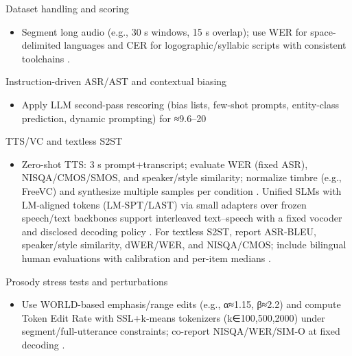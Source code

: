 \documentclass{article}
\begin{document}
Dataset handling and scoring
\begin{itemize}
  \item Segment long audio (e.g., 30 s windows, 15 s overlap); use WER for space-delimited languages and CER for logographic/syllabic scripts with consistent toolchains \cite{nguyen2025qwenvsgemmaintegrationwhispercomparative}.
\end{itemize}

Instruction-driven ASR/AST and contextual biasing
\begin{itemize}
  \item Apply LLM second-pass rescoring (bias lists, few-shot prompts, entity-class prediction, dynamic prompting) for ≈9.6–20%
\end{itemize}

TTS/VC and textless S2ST
\begin{itemize}
  \item Zero-shot TTS: 3 s prompt+transcript; evaluate WER (fixed ASR), NISQA/CMOS/SMOS, and speaker/style similarity; normalize timbre (e.g., FreeVC) and synthesize multiple samples per condition \cite{wang2024evaluatingtextspeechsynthesislargediscre}. Unified SLMs with LM-aligned tokens (LM‑SPT/LAST) via small adapters over frozen speech/text backbones support interleaved text–speech with a fixed vocoder and disclosed decoding policy \cite{turetzky2024lastlanguagemodelawarespeechtokenization,wang2023slmbridgethingapbetweenspeechtextfoundat,jo2025lmsptalignedsemanticdistillationspeechto}. For textless S2ST, report ASR‑BLEU, speaker/style similarity, dWER/WER, and NISQA/CMOS; include bilingual human evaluations with calibration and per-item medians \cite{peng2024mslms2stmultitaskspeechlanguagemodeltext,li2024investigatingneuralaudiocodecsspeechlang,huang2023holisticcascadesystembenchmarkhumanevalu}.
\end{itemize}

Prosody stress tests and perturbations
\begin{itemize}
  \item Use WORLD-based emphasis/range edits (e.g., α≈1.15, β≈2.2) and compute Token Edit Rate with SSL+k‑means tokenizers (k∈{100,500,2000}) under segment/full-utterance constraints; co-report NISQA/WER/SIM‑O at fixed decoding \cite{li2024investigatingneuralaudiocodecsspeechlang}.
\end{itemize}
\end{document}
